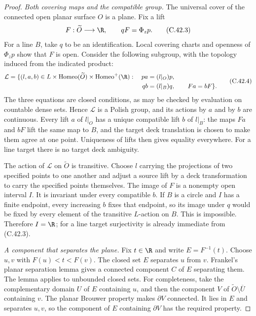 \begin{proof}
\emph{Both covering maps and the compatible group.}
The universal cover of the connected open planar
surface $O$ is a plane. Fix a lift
\[
 F:\widetilde O\longrightarrow\R,\qquad
                      qF=\Phi_zp.
                                                        \tag{C.42.3}
\]
For a line $B$, take $q$ to be an identification.
Local covering charts and openness of $\Phi_zp$
show that $F$ is open.
Consider the following subgroup, with the topology
induced from the indicated product:
\[
\begin{split}
\mathcal L=\{(l,a,b)\in
 L\times\operatorname{Homeo}(\widetilde O)
       \times\operatorname{Homeo}^+(\R):\quad
 pa&=(l|_O)p,\\
 qb&=(l|_B)q,\qquad Fa=bF\}.
\end{split}
                                                        \tag{C.42.4}
\]
The three equations are closed conditions, as may
be checked by evaluation on countable dense sets.
Hence $\mathcal L$ is a Polish group, and its
actions by $a$ and by $b$ are continuous.
Every lift $a$ of $l|_O$ has a unique compatible
lift $b$ of $l|_B$: the maps $Fa$ and $bF$ lift
the same map to $B$, and the target deck translation
is chosen to make them agree at one point.
Uniqueness of lifts then gives equality everywhere.
For a line target there is no target deck ambiguity.

The action of $\mathcal L$ on $\widetilde O$ is
transitive. Choose $l$ carrying the projections of
two specified points to one another and adjust a
source lift by a deck transformation to carry the
specified points themselves.
The image of $F$ is a nonempty open interval $I$.
It is invariant under every compatible $b$.
If $B$ is a circle and $I$ has a finite endpoint,
every increasing $b$ fixes that endpoint, so its
image under $q$ would be fixed by every element
of the transitive $L$-action on $B$. This is
impossible. Therefore $I=\R$; for a line target
surjectivity is already immediate from (C.42.3).

\emph{A component that separates the plane.}
Fix $t\in\R$ and write $E=F^{-1}(t)$.
Choose $u,v$ with $F(u)<t<F(v)$. The closed set
$E$ separates $u$ from $v$. Frankel's planar
separation lemma \cite[Lemma 2.7, p.~1258]{C_Frankel2015}
gives a connected component $C$ of $E$ separating
them. The lemma applies to unbounded closed sets.
For completeness, take the complementary domain
$U$ of $E$ containing $u$, and then the component
$V$ of $\widetilde O\setminus\overline U$ containing
$v$. The planar Brouwer property makes
$\partial V$ connected. It lies in $E$ and
separates $u,v$, so the component of $E$ containing
$\partial V$ has the required property.


\end{proof}
